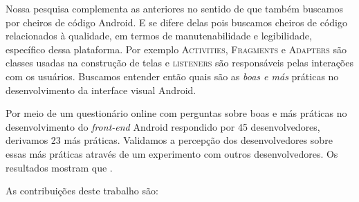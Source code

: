 
Nossa pesquisa complementa as anteriores no sentido de que também buscamos por cheiros de código Android. E se difere delas pois buscamos cheiros de código relacionados à qualidade, em termos de manutenabilidade e legibilidade, específico dessa plataforma. Por exemplo \textsc{Activities}, \textsc{Fragments} e \textsc{Adapters} são classes usadas na construção de telas e \textsc{listeners} são responsáveis pelas interações com os usuários. Buscamos entender então quais são as \emph{boas e más} práticas no desenvolvimento da interface visual Android. 


 

Por meio de um questionário online com perguntas sobre boas e más práticas no desenvolvimento do \textit{front-end} Android respondido por 45 desenvolvedores, derivamos 23 más práticas. Validamos a percepção dos desenvolvedores sobre essas más práticas através de um experimento com outros  desenvolvedores. 
Os resultados mostram que .


As contribuições deste trabalho são:

